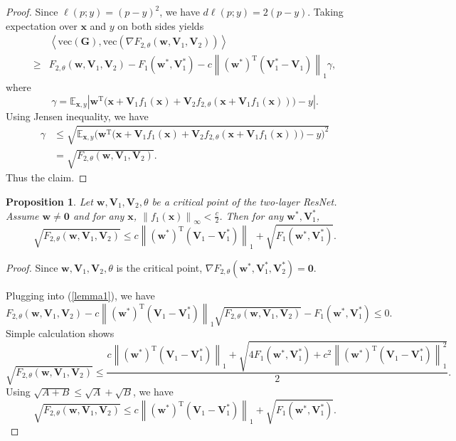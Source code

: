 \documentclass{article}
\theoremstyle{plain}
\newtheorem{prop}{Proposition}
\theoremstyle{definition}
\newcommand{\norm}[1]{\left\lVert#1\right\rVert}
\newcommand{\abs}[1]{\left|#1\right|}
\newcommand{\iprod}[2]{\left\langle #1,#2 \right\rangle}
\begin{document}
\begin{proof}
    Since $\ell(p;y)=(p-y)^2$, we have $d\ell(p;y)=2(p-y)$. Taking expectation over $\mathbf{x}$ and $y$ on both sides yields
    \begin{align*}
    &\iprod{\text{vec}(\mathbf{G})}
        {\text{vec}\left(\nabla F_{2,\theta}(\mathbf{w},\mathbf{V}_1,\mathbf{V}_2)\right)}\\
    \geq & F_{2,\theta}(\mathbf{w},\mathbf{V}_1,\mathbf{V}_2)
    -F_1(\mathbf{w}^*,\mathbf{V}_1^*)
        -c\norm{\left(\mathbf{w}^*\right)^\mathrm{T}\left(\mathbf{V}_1^*-\mathbf{V}_1\right)}_1\gamma,
    \end{align*}
    where
    \[
        \gamma=\mathbb{E}_{\mathbf{x},y}
        \abs{\mathbf{w}^\mathrm{T}\big(\mathbf{x}+\mathbf{V}_1f_1(\mathbf{x})
        +\mathbf{V}_2f_{2,\theta}\left(\mathbf{x}+\mathbf{V}_1f_1(\mathbf{x})\right)\big)-y}.
    \]
    Using Jensen inequality, we have
    \begin{align*}
        \gamma & \leq \sqrt{\mathbb{E}_{\mathbf{x},y}
        \Big(\mathbf{w}^\mathrm{T}\big(\mathbf{x}+\mathbf{V}_1f_1(\mathbf{x})
        +\mathbf{V}_2f_{2,\theta}\left(\mathbf{x}+\mathbf{V}_1f_1(\mathbf{x})\right)\big)-y\Big)^2}\\
        & = \sqrt{F_{2,\theta}(\mathbf{w},\mathbf{V}_1,\mathbf{V}_2)}.
    \end{align*}
    Thus the claim.
\end{proof}

\begin{prop}
Let $\mathbf{w},\mathbf{V}_1,\mathbf{V}_2,\theta$ be a critical point of the two-layer ResNet.
Assume $\mathbf{w}\neq\mathbf{0}$ and
for any $\mathbf{x}$, $\norm{f_1(\mathbf{x})}_\infty<\frac c 2$. Then for any $\mathbf{w}^*,\mathbf{V}_1^*$,
\[
\sqrt{F_{2,\theta}\left(\mathbf{w},\mathbf{V}_1,\mathbf{V}_2\right)}\leq
c\norm{\left(\mathbf{w}^*\right)^\mathrm{T}\left(\mathbf{V}_1-\mathbf{V}_1^*\right)}_1
    +\sqrt{F_1(\mathbf{w}^*,\mathbf{V}_1^*)}.
\]
\end{prop}

\begin{proof}
Since $\mathbf{w},\mathbf{V}_1,\mathbf{V}_2,\theta$ is the critical point,
$\nabla F_{2,\theta}(\mathbf{w}^*,\mathbf{V}_1^*,\mathbf{V}_2^*)=\mathbf{0}$.

Plugging into (\ref{lemma1}), we have
\[
    F_{2,\theta}\left(\mathbf{w},\mathbf{V}_1,\mathbf{V}_2\right)
    -c\norm{\left(\mathbf{w}^*\right)^\mathrm{T}\left(\mathbf{V}_1-\mathbf{V}_1^*\right)}_1
    \sqrt{F_{2,\theta}(\mathbf{w},\mathbf{V}_1,\mathbf{V}_2)}-F_1\left(\mathbf{w}^*,\mathbf{V}_1^*\right)\leq 0.
\]
Simple calculation shows
\[
    \sqrt{F_{2,\theta}\left(\mathbf{w},\mathbf{V}_1,\mathbf{V}_2\right)}\leq
    \frac{
    c\norm{\left(\mathbf{w}^*\right)^\mathrm{T}\left(\mathbf{V}_1-\mathbf{V}_1^*\right)}_1
    +\sqrt{4F_1\left(\mathbf{w}^*,\mathbf{V}_1^*\right)+
    c^2\norm{\left(\mathbf{w}^*\right)^\mathrm{T}\left(\mathbf{V}_1-\mathbf{V}_1^*\right)}_1^2}
    }{2}.
\]
Using $\sqrt{A+B}\leq\sqrt{A}+\sqrt{B}$, we have
\[
    \sqrt{F_{2,\theta}\left(\mathbf{w},\mathbf{V}_1,\mathbf{V}_2\right)}\leq
c\norm{\left(\mathbf{w}^*\right)^\mathrm{T}\left(\mathbf{V}_1-\mathbf{V}_1^*\right)}_1
    +\sqrt{F_1(\mathbf{w}^*,\mathbf{V}_1^*)}.
\]
\end{proof}
\end{document}
